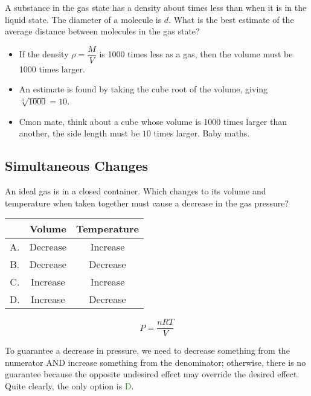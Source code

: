 \documentclass[a4paper,12pt]{article}
\newcommand{\lb}{\\[8pt]}
\begin{document}
A substance in the gas state has a density about times less than
when it is in the liquid state. The diameter of a molecule is $d$. What is the best estimate of the average distance between molecules in the gas state?

\begin{itemize}
  \item If the density $\rho = \dfrac{M}{V}$ is 1000 times less as a gas, then the volume must be 1000 times larger.
  \item An estimate is found by taking the cube root of the volume, giving $\sqrt[3]{1000} = 10$.
  \item Cmon mate, think about a cube whose volume is 1000 times larger than another, the side length must be $10$ times larger. Baby maths.
\end{itemize}

\pagebreak

\subsection{Simultaneous Changes}

An ideal gas is in a closed container. Which changes to its volume and temperature when taken together must cause a decrease in the gas
pressure?

\begin{table}[H]
  \centering
  \begin{tabular}{|c|c|c|}\hline
       & Volume   & Temperature \\ \hline
    A. & Decrease & Increase    \\ \hline
    B. & Decrease & Decrease    \\ \hline
    C. & Increase & Increase    \\ \hline
    D. & Increase & Decrease    \\ \hline
  \end{tabular}
\end{table}

$$P = \frac{nRT}{V}$$

To guarantee a decrease in pressure, we need to decrease something from the numerator AND increase something from the denominator; otherwise, there is no guarantee because the opposite undesired effect may override the desired effect.\lb
Quite clearly, the only option is \textcolor{ForestGreen}{D}.
\end{document}
